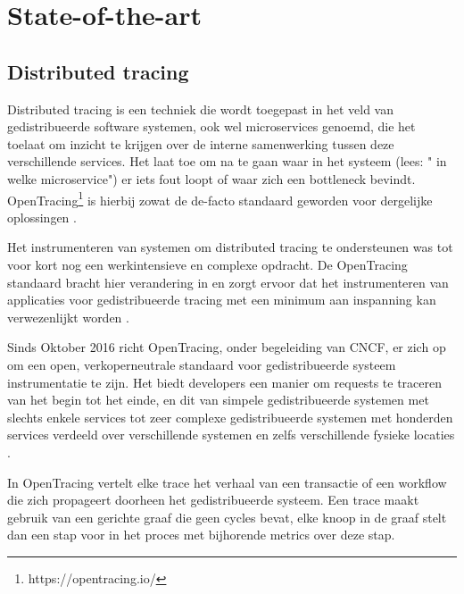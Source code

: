 \section{State-of-the-art}
\label{sec:state-of-the-art}

\subsection{Distributed tracing}
Distributed tracing is een techniek die wordt toegepast in het veld van gedistribueerde software systemen, ook wel microservices genoemd, die het toelaat om inzicht te krijgen over de interne samenwerking tussen deze verschillende services. Het laat toe om na te gaan waar in het systeem (lees: " in welke microservice") er iets fout loopt of waar zich een bottleneck bevindt. OpenTracing\footnote{https://opentracing.io/} is hierbij zowat de de-facto standaard geworden voor dergelijke oplossingen \autocite{Sematext2018} \autocite{Jacqueline2018}.

Het instrumenteren van systemen om distributed tracing te ondersteunen was tot voor kort nog een werkintensieve en complexe opdracht. De OpenTracing standaard bracht hier verandering in en zorgt ervoor dat het instrumenteren van applicaties voor gedistribueerde tracing met een minimum aan inspanning kan verwezenlijkt worden \autocite{Gianluca2017}. 

Sinds Oktober 2016 richt OpenTracing, onder begeleiding van \gls{CNCF}, er zich op om een open, verkoperneutrale standaard voor gedistribueerde systeem instrumentatie te zijn. Het biedt developers een manier om requests te traceren van het begin tot het einde, en dit van simpele gedistribueerde systemen met slechts enkele services tot zeer complexe gedistribueerde systemen met honderden services verdeeld over verschillende systemen en zelfs verschillende fysieke locaties \autocite{Gianluca2017}.

In OpenTracing vertelt elke trace het verhaal van een transactie of een workflow die zich propageert doorheen het gedistribueerde systeem. Een trace maakt gebruik van een gerichte graaf die geen cycles bevat, elke knoop in de graaf stelt dan een stap voor in het proces met bijhorende metrics over deze stap. \autocite{Sematext2018}

